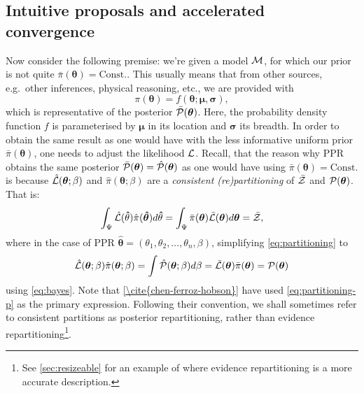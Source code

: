 \documentclass[usenatbib]{mnras}
\begin{document}
\subsection{Intuitive proposals and accelerated
  convergence\label{sec:accelerating}}
Now consider the following premise: we're given a model \({\cal M}\),
for which our prior is not quite
\(\bar{\pi}(\bm{\theta}) = \text{Const.}\). This usually means that
from other sources, e.g.~other inferences, physical reasoning, etc.,
we are provided with
\begin{equation}
  \pi (\bm{\theta}) = f(\bm{\theta}; \bm{\mu}, \bm{\sigma}),
 \label{eq:bias}
\end{equation}
which is representative of the posterior
\(\bar{\cal P}(\bm{\theta})\). Here, the probability density function
$f$ is parameterised by \(\bm{\mu}\) in its location and
\(\bm{\sigma}\) its breadth. In order to obtain the same result as one
would have with the less informative uniform prior
\(\bar{\pi}(\bm{\theta})\), one needs to adjust the likelihood
${\cal L}$. Recall, that the reason why PPR obtains the same posterior
\( \bar{\cal P}(\bm{\theta})= \hat{\cal P}(\bm{\theta})\) as one would
have using \( \bar{\pi} (\bm{\theta}) = \text{Const.}\) is because
\( \hat{\cal L} (\bm{\theta};\beta)\) and
\( \hat{\pi} (\bm{\theta};\beta)\) are a \emph{consistent
  (re)partitioning} of \( \bar{\cal Z}\) and
\({\cal P}(\bm{\theta})\). That is:
\begin{equation}
  \label{eq:partitioning}
  \int_{\Psi} \hat{\cal L} (\bm\hat{\theta}) \hat{\pi} (\bm{\hat{\theta}}) d\bm\hat{\theta}  = \int_{\Psi}\bar{\pi} (\bm{\theta}) \bar{\cal L} (\bm{\theta}) d\bm{\theta} = \bar{\cal Z}, 
\end{equation}
where in the case of PPR
$\bm\hat{\theta} = (\theta_{1}, \theta_{2}, \ldots, \theta_{n},
\beta)$, simplifying \cref{eq:partitioning} to
\begin{equation}
  \label{eq:partitioning-p}
  \hat{\cal L}(\bm{\theta};\beta) \hat{\pi}(\bm{\theta};\beta) = \int \hat{\cal P}(\bm{\theta};\beta) d\beta = \bar{\cal L}(\bm{\theta})\bar{\pi}(\bm{\theta}) = {\cal P}(\bm{\theta})
\end{equation}
using \cref{eq:bayes}. Note that \cref{\cite{chen-ferroz-hobson}} have
used \cref{eq:partitioning-p} as the primary expression. Following
their convention, we shall sometimes refer to consistent partitions as
posterior repartitioning, rather than evidence
repartitioning\footnote{See \cref{sec:resizeable} for an example of
  where evidence repartitioning is a more accurate description.}.
\end{document}
